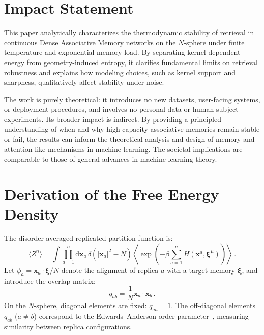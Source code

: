 \documentclass{article}
\newcommand{\dd}{{\mathrm{d}}}
\theoremstyle{plain}
\theoremstyle{definition}
\theoremstyle{remark}
\begin{document}
\section*{Impact Statement}

This paper analytically characterizes the thermodynamic stability of retrieval in continuous Dense Associative Memory networks on the $N$-sphere under finite temperature and exponential memory load. By separating kernel-dependent energy from geometry-induced entropy, it clarifies fundamental limits on retrieval robustness and explains how modeling choices, such as kernel support and sharpness, qualitatively affect stability under noise.

The work is purely theoretical: it introduces no new datasets, user-facing systems, or deployment procedures, and involves no personal data or human-subject experiments. Its broader impact is indirect. By providing a principled understanding of when and why high-capacity associative memories remain stable or fail, the results can inform the theoretical analysis and design of memory and attention-like mechanisms in machine learning. The societal implications are comparable to those of general advances in machine learning theory.




\nocite{langley00}




\newpage
\appendix
\onecolumn

\section{Derivation of the Free Energy Density}\label{app:free_energy}

The disorder-averaged replicated partition function is:
\begin{equation}
    \langle Z^n \rangle = \int \prod_{a=1}^n \dd\bm{x}_a \, \delta(|\bm{x}_a|^2 - N) \left\langle \exp\left(-\beta \sum_{a=1}^n H(\bm{x}^a, \bm{\xi}^\mu)\right) \right\rangle\,.
    \label{eq:Zn}
\end{equation}
Let $\phi_a = \bm{x}_a \cdot \bm{\xi}/N$ denote the alignment of replica $a$ with a target memory $\bm{\xi}$, and introduce the overlap matrix:
\begin{equation}
    q_{ab} = \frac{1}{N} \bm{x}_a \cdot \bm{x}_b\,.
\end{equation}
On the $N$-sphere, diagonal elements are fixed: $q_{aa} = 1$. The off-diagonal elements $q_{ab}$ ($a \neq b$) correspond to the Edwards–Anderson order parameter~\citep{ea75}, measuring similarity between replica configurations.
\end{document}
